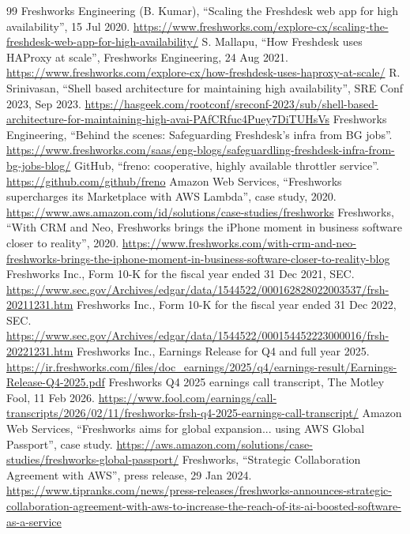 \documentclass[10pt,a4paper]{article}
\begin{document}
\begin{thebibliography}{99}
 Freshworks Engineering (B. Kumar), ``Scaling the Freshdesk web app for high availability'', 15 Jul 2020. \url{https://www.freshworks.com/explore-cx/scaling-the-freshdesk-web-app-for-high-availability/}
 S. Mallapu, ``How Freshdesk uses HAProxy at scale'', Freshworks Engineering, 24 Aug 2021. \url{https://www.freshworks.com/explore-cx/how-freshdesk-uses-haproxy-at-scale/}
 R. Srinivasan, ``Shell based architecture for maintaining high availability'', SRE Conf 2023, Sep 2023. \url{https://hasgeek.com/rootconf/sreconf-2023/sub/shell-based-architecture-for-maintaining-high-avai-PAfCRfuc4Puey7DiTUHsVs}
 Freshworks Engineering, ``Behind the scenes: Safeguarding Freshdesk's infra from BG jobs''. \url{https://www.freshworks.com/saas/eng-blogs/safeguardling-freshdesk-infra-from-bg-jobs-blog/}
 GitHub, ``freno: cooperative, highly available throttler service''. \url{https://github.com/github/freno}
 Amazon Web Services, ``Freshworks supercharges its Marketplace with AWS Lambda'', case study, 2020. \url{https://www.aws.amazon.com/id/solutions/case-studies/freshworks}
 Freshworks, ``With CRM and Neo, Freshworks brings the iPhone moment in business software closer to reality'', 2020. \url{https://www.freshworks.com/with-crm-and-neo-freshworks-brings-the-iphone-moment-in-business-software-closer-to-reality-blog}
 Freshworks Inc., Form 10-K for the fiscal year ended 31 Dec 2021, SEC. \url{https://www.sec.gov/Archives/edgar/data/1544522/000162828022003537/frsh-20211231.htm}
 Freshworks Inc., Form 10-K for the fiscal year ended 31 Dec 2022, SEC. \url{https://www.sec.gov/Archives/edgar/data/1544522/000154452223000016/frsh-20221231.htm}
 Freshworks Inc., Earnings Release for Q4 and full year 2025. \url{https://ir.freshworks.com/files/doc_earnings/2025/q4/earnings-result/Earnings-Release-Q4-2025.pdf}
 Freshworks Q4 2025 earnings call transcript, The Motley Fool, 11 Feb 2026. \url{https://www.fool.com/earnings/call-transcripts/2026/02/11/freshworks-frsh-q4-2025-earnings-call-transcript/}
 Amazon Web Services, ``Freshworks aims for global expansion... using AWS Global Passport'', case study. \url{https://aws.amazon.com/solutions/case-studies/freshworks-global-passport/}
 Freshworks, ``Strategic Collaboration Agreement with AWS'', press release, 29 Jan 2024. \url{https://www.tipranks.com/news/press-releases/freshworks-announces-strategic-collaboration-agreement-with-aws-to-increase-the-reach-of-its-ai-boosted-software-as-a-service}

\end{thebibliography}
\end{document}
